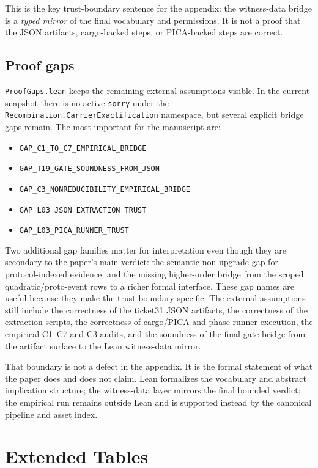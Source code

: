 \documentclass[11pt]{article}
\theoremstyle{definition}
\begin{document}
This is the key trust-boundary sentence for the appendix: the witness-data bridge is a
\emph{typed mirror} of the final vocabulary and permissions. It is not a proof that the
JSON artifacts, cargo-backed steps, or PICA-backed steps are correct.

\subsection{Proof gaps}

\nolinkurl{ProofGaps.lean} keeps the remaining external assumptions visible. In the current
snapshot there is no active \texttt{sorry} under the
\texttt{Recombination.CarrierExactification} namespace, but several explicit bridge gaps
remain. The most important for the manuscript are:
\begin{itemize}[leftmargin=*]
\item \texttt{GAP\_C1\_TO\_C7\_EMPIRICAL\_BRIDGE}
\item \texttt{GAP\_T19\_GATE\_SOUNDNESS\_FROM\_JSON}
\item \texttt{GAP\_C3\_NONREDUCIBILITY\_EMPIRICAL\_BRIDGE}
\item \texttt{GAP\_L03\_JSON\_EXTRACTION\_TRUST}
\item \texttt{GAP\_L03\_PICA\_RUNNER\_TRUST}
\end{itemize}

Two additional gap families matter for interpretation even though they are secondary to the
paper's main verdict: the semantic non-upgrade gap for protocol-indexed evidence, and the
missing higher-order bridge from the scoped quadratic/proto-event rows to a richer formal
interface. These gap names are useful because they make the trust boundary specific. The
external assumptions still include the correctness of the ticket31 JSON artifacts, the
correctness of the extraction scripts, the correctness of cargo/PICA and phase-runner
execution, the empirical C1--C7 and C3 audits, and the soundness of the final-gate bridge
from the artifact surface to the Lean witness-data mirror.

That boundary is not a defect in the appendix. It is the formal statement of what the paper
does and does not claim. Lean formalizes the vocabulary and abstract implication structure;
the witness-data layer mirrors the final bounded verdict; the empirical run remains outside
Lean and is supported instead by the canonical pipeline and asset index.
 \section{Extended Tables}
\label{app:extended-tables}
\end{document}
